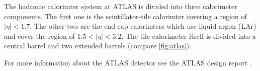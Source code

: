 The hadronic calorimter system at ATLAS is divided into three calorimeter components. The first one is the scintillator-tile calorimter covering a region of $|\eta|<\num{1.7}$. The other two are the end-cap calorimters which use liquid argon (LAr) and cover the region of $\num{1.5}<|\eta|<\num{3.2}$.
The tile calorimeter itself is divided into a central barrel and two extended barrels (compare \ref{fig:atlas}).


For more information about the ATLAS detector see the ATLAS design report \cite{atlastdr}.

